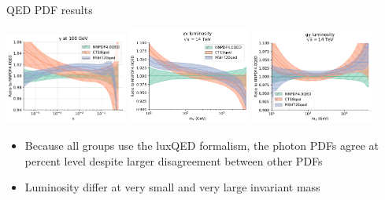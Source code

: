 \documentclass[aspectratio=169, 8pt,t]{beamer}
\begin{document}
\begin{frame}{QED PDF results}
  \begin{center}
    \includegraphics[width=0.3\textwidth]{figures/photon_comparison.pdf}
    \includegraphics[width=0.3\textwidth]{figures/pp_lumi_comparison.png}
    \includegraphics[width=0.3\textwidth]{figures/gp_lumi_comparison.pdf}
  \end{center}
  \begin{itemize}
    \item Because all groups use the luxQED formalism, the photon PDFs agree at percent level despite larger disagreement between other PDFs
    \item Luminosity differ at very small and very large invariant mass
  \end{itemize}
\end{frame}
\end{document}

